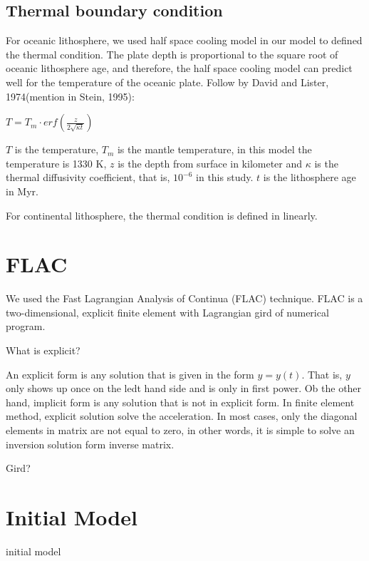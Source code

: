 \subsection{Thermal boundary condition}

For oceanic lithosphere, we used half space cooling model in our model to defined the thermal condition. 
The plate depth is proportional to the square root of oceanic lithosphere age, and therefore, the half space cooling model can predict well for the temperature of the oceanic plate.
Follow by David and Lister, 1974(mention in Stein, 1995):

$T=T_m\cdot {erf}(\frac{z}{2\sqrt{\kappa t}})$

$T$ is the temperature, $T_m$ is the mantle temperature, in this model the temperature is 1330 K,
$z$ is the depth from surface in kilometer and $\kappa$ is the thermal diffusivity coefficient, that is, $10^{-6}$ in this study.
$t$ is the lithosphere age in Myr.


For continental lithosphere, the thermal condition is defined in linearly.


\section{FLAC}

We used the Fast Lagrangian Analysis of Continua (FLAC) technique. FLAC is a two-dimensional, explicit finite element with Lagrangian gird of numerical program.

What is explicit?

An explicit form is any solution that is given in the form $y=y(t)$. That is, $y$ only shows up once on the ledt hand side and is only in first power. Ob the other hand, implicit form is any solution that is not in explicit form. In finite element method, explicit solution solve the acceleration. In most cases, only the diagonal elements in matrix are not equal to zero, in other words, it is simple to solve an inversion solution form inverse matrix. 

Gird?



\section{Initial Model}

initial model


